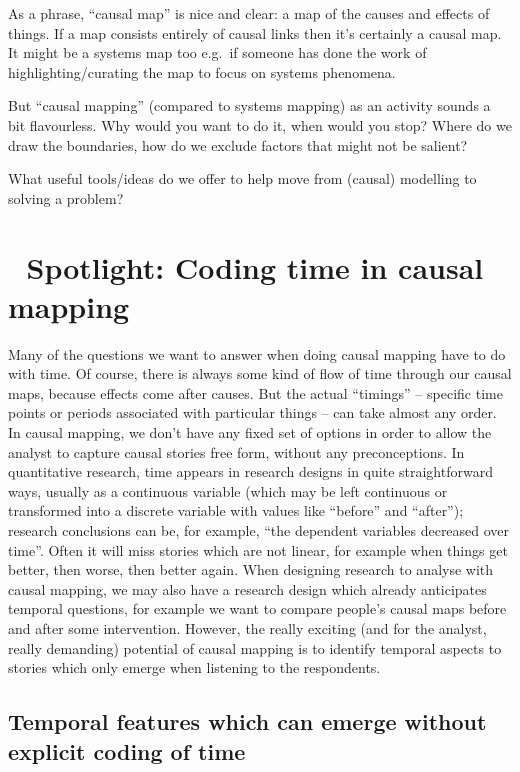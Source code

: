\documentclass[
]{book}
\begin{document}
As a phrase, ``causal map'' is nice and clear: a map of the causes and effects of things. If a map consists entirely of causal links then it's certainly a causal map. It might be a systems map too e.g.~if someone has done the work of highlighting/curating the map to focus on systems phenomena.

But ``causal mapping'' (compared to systems mapping) as an activity sounds a bit flavourless. Why would you want to do it, when would you stop? Where do we draw the boundaries, how do we exclude factors that might not be salient?

What useful tools/ideas do we offer to help move from (causal) modelling to solving a problem?

\hypertarget{spotlight-coding-time-in-causal-mapping}{%
\chapter{🧠 Spotlight: Coding time in causal mapping}\label{spotlight-coding-time-in-causal-mapping}}

Many of the questions we want to answer when doing causal mapping have to do with time. Of course, there is always some kind of flow of time through our causal maps, because effects come after causes. But the actual ``timings'' -- specific time points or periods associated with particular things -- can take almost any order. In causal mapping, we don't have any fixed set of options in order to allow the analyst to capture causal stories free form, without any preconceptions. In quantitative research, time appears in research designs in quite straightforward ways, usually as a continuous variable (which may be left continuous or transformed into a discrete variable with values like ``before'' and ``after''); research conclusions can be, for example, ``the dependent variables decreased over time''. Often it will miss stories which are not linear, for example when things get better, then worse, then better again. When designing research to analyse with causal mapping, we may also have a research design which already anticipates temporal questions, for example we want to compare people's causal maps before and after some intervention. However, the really exciting (and for the analyst, really demanding) potential of causal mapping is to identify temporal aspects to stories which only emerge when listening to the respondents.

\hypertarget{temporal-features-which-can-emerge-without-explicit-coding-of-time}{%
\section{Temporal features which can emerge without explicit coding of time}\label{temporal-features-which-can-emerge-without-explicit-coding-of-time}}
\end{document}
